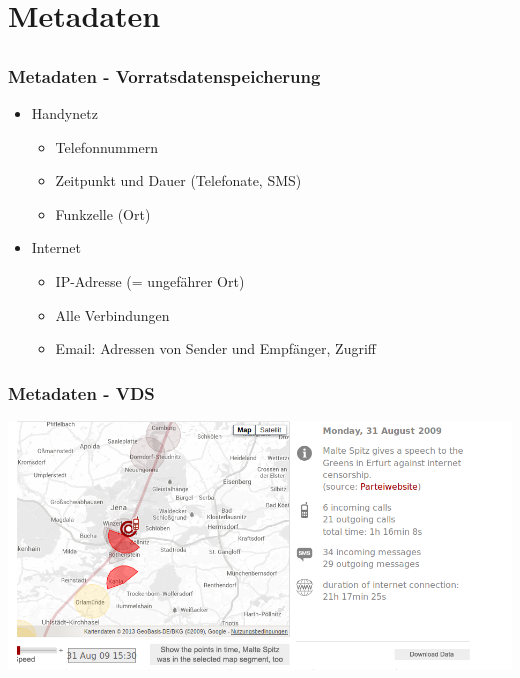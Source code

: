 \documentclass[12pt]{beamer}
\begin{document}
\section{Metadaten}
\subsection{}

\begin{frame}
  \frametitle{Metadaten - Vorratsdatenspeicherung}
  \begin{itemize}
    \item Handynetz
      \begin{itemize}
        \item Telefonnummern
        \item Zeitpunkt und Dauer (Telefonate, SMS)
        \item Funkzelle (Ort)
      \end{itemize}
    \item Internet
      \begin{itemize}
        \item IP-Adresse (= ungefährer Ort)
        \item Alle Verbindungen
        \item Email: Adressen von Sender und Empfänger, Zugriff
      \end{itemize}
  \end{itemize}
\end{frame}

\begin{frame}
    \frametitle{Metadaten - VDS}
    \includegraphics[height=0.7\textheight]{img/maltespitz.png}
\end{frame}

\end{document}
